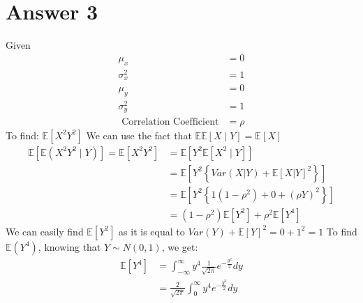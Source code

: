 \documentclass[a4paper]{article}
\begin{document}
\section{Answer 3}
Given 
\begin{equation*}
	\begin{split}
		\mu_x &=  0\\
		\sigma_{x}^2 &= 1\\
		\mu_y &=  0\\
		\sigma_{y}^2 &= 1\\
		\text{ Correlation Coefficient} &= \rho 
	\end{split}
\end{equation*}
To find: $\mathbb{E}\left[ X^2Y^2 \right] $
\newline\newline
We can use the fact that $\mathbb{E}\mathbb{E}\left[ X \mid Y \right] = \mathbb{E}\left[ X \right] $  
\newline\newline
\begin{equation*}
	\begin{split}
		\mathbb{E}\left[ \mathbb{E}\left( X^2Y^2  \mid Y\right)  \right]=\mathbb{E}\left[ X^2Y^2 \right]  &=  \mathbb{E}\left[ Y^2\mathbb{E}\left[ X^2 \mid Y \right]  \right]\\
		&= \mathbb{E}\left[ Y^2\left\{ Var\left( X|Y \right) + \mathbb{E}\left[ X|Y \right] ^2 \right\}  \right]\\
		&= \mathbb{E}\left[ Y^2\left\{ 1\left( 1- \rho^2 \right) + 0 + \left( \rho Y \right) ^2 \right\}  \right]\\
		&= \left( 1-\rho^2 \right) \mathbb{E}\left[ Y^2 \right] + \rho^2\mathbb{E}\left[ Y^4 \right] 
	\end{split}
\end{equation*}
We can easily find $\mathbb{E}\left[ Y^2 \right] $ as it is equal to $Var\left( Y \right) + \mathbb{E}\left[ Y \right] ^2 = 0 +1^2 = 1$
\newline\newline
To find $\mathbb{E}\left( Y^{4} \right) $, knowing that $Y \sim N\left( 0,1 \right) $, we get:
\begin{equation*}
	\begin{split}
		\mathbb{E}\left[ Y^{4} \right] &= \int_{-\infty}^{\infty} y^{4} \frac{1}{\sqrt{2\pi} } e^{-\frac{y^2}{2}} dy\\
		&= \frac{2}{\sqrt{2\pi} }\int_0^{\infty} y^{4}e^{-\frac{y^2}{2}}dy  
	\end{split}
\end{equation*}
\end{document}
